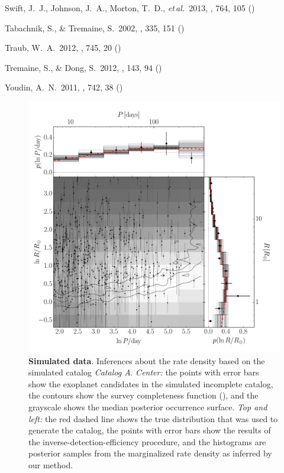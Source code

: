 \documentclass[12pt,preprint]{aastex}
\newcommand{\foreign}[1]{\emph{#1}}
\newcommand{\etal}{\foreign{et\,al.}}
\newcommand{\figlabel}[1]{\label{fig:#1}}
\newcommand{\modela}{\emph{Catalog A}}
\begin{document}
\begin{thebibliography}{}
\bibitem[Swift \etal(2013)]{swift}
Swift, J.~J., Johnson, J.~A., Morton, T.~D., \etal\ 2013, \apj, 764, 105
()

Tabachnik, S., \& Tremaine, S.\ 2002, \mnras, 335, 151
()

Traub, W.~A.\ 2012, \apj, 745, 20 ()

Tremaine, S., \& Dong, S.\ 2012, \aj, 143, 94 ()

Youdin, A.~N.\ 2011, \apj, 742, 38 ()

\end{thebibliography}

\clearpage

\begin{figure}[p]
\begin{center}
\includegraphics[width=\textwidth]{figures/smooth/results.pdf}
\end{center}
\caption{%
{\bf Simulated data}.
Inferences about the rate density based on the simulated catalog \modela.
\emph{Center:} the points with error bars show the exoplanet candidates in the
simulated incomplete catalog, the contours show the survey completeness
function (\citealt{petigura}), and the grayscale shows the median posterior
occurrence surface.
\emph{Top and left:} the red dashed line shows the true distribution that was
used to generate the catalog, the points with error bars show the results of
the inverse-detection-efficiency procedure, and the histograms are posterior
samples from the marginalized rate density as inferred by our method.
\figlabel{smooth-results}}
\end{figure}
\end{document}
